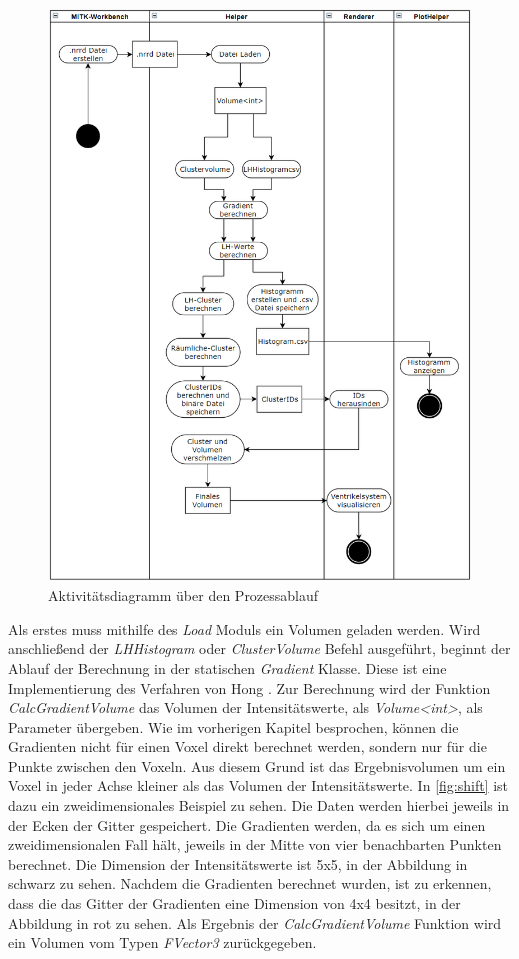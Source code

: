 \begin{figure}
\centering 
\includegraphics[width=\textwidth]{Logos/Ueberblick2.png}
\caption{Aktivitätsdiagramm über den Prozessablauf} 
\label{fig:ueberblick} 
\end{figure}

Als erstes muss mithilfe des \textit{Load} Moduls ein Volumen geladen werden. Wird anschließend der  \textit{LHHistogram} oder \textit{ClusterVolume} Befehl ausgeführt, beginnt der Ablauf der Berechnung in der statischen \textit{Gradient} Klasse.
Diese ist eine Implementierung des Verfahren von Hong \cite{hong2003method}. Zur Berechnung wird der Funktion \textit{CalcGradientVolume} das Volumen der Intensitätswerte, als \textit{Volume<int>}, als Parameter übergeben. Wie im vorherigen Kapitel besprochen, können die Gradienten nicht für einen Voxel direkt berechnet werden, sondern nur für die Punkte zwischen den Voxeln. Aus diesem Grund ist das Ergebnisvolumen um ein Voxel in jeder Achse kleiner als das Volumen der Intensitätswerte.
\newline
In \autoref{fig:shift} ist dazu ein zweidimensionales Beispiel zu sehen. Die Daten werden hierbei jeweils in der Ecken der Gitter gespeichert. Die Gradienten werden, da es sich um einen zweidimensionalen Fall hält, jeweils in der Mitte von vier benachbarten Punkten berechnet.
Die Dimension der Intensitätswerte ist 5x5, in der Abbildung in schwarz zu sehen. Nachdem die Gradienten berechnet wurden, ist zu erkennen, dass die das Gitter der Gradienten eine Dimension von 4x4 besitzt, in der Abbildung in rot zu sehen.
Als Ergebnis der \textit{CalcGradientVolume} Funktion wird ein Volumen vom Typen \textit{FVector3} zurückgegeben.


